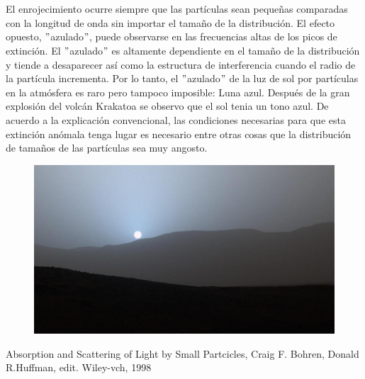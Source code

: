 \documentclass[11pt]{article}
\begin{document}
\\ \\
El enrojecimiento ocurre siempre que las partículas sean pequeñas comparadas con la longitud de onda sin importar el tamaño de la distribución. El efecto opuesto, $"$azulado$"$, puede observarse en las frecuencias altas de los picos de extinción. El  $"$azulado$"$ es altamente dependiente en el tamaño de la distribución y tiende a desaparecer así como la estructura de interferencia cuando el radio de la partícula incrementa. Por lo tanto, el  $"$azulado$"$ de la luz de sol por partículas en la atmósfera es raro pero tampoco imposible: Luna azul. Después de la gran explosión del volcán Krakatoa se observo que el sol tenia un tono azul. De acuerdo a la explicación convencional, las condiciones necesarias para que esta extinción anómala tenga lugar es necesario entre otras cosas que la distribución de tamaños de las partículas sea muy angosto.


\begin{figure}[H]
\centering
\includegraphics[scale=1.0]{3.jpg}
\label{fig:p0}
\end{figure}





\begin{thebibliography}{99}
Absorption and Scattering of Light by Small Partcicles, Craig F. Bohren, Donald R.Huffman, edit. Wiley-vch, 1998
\end{thebibliography}
\end{document}
